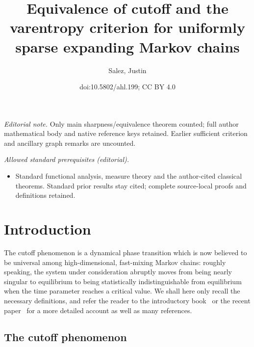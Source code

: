 \documentclass[10pt]{amsart}
\title{Equivalence of cutoff and the varentropy criterion for uniformly sparse expanding Markov chains}
\author{Salez, Justin}
\date{doi:10.5802/ahl.199; CC BY 4.0}
\theoremstyle{definition}\newtheorem{defi}[theo]{Definition}\newtheorem{rema}[theo]{Remark}\newtheorem{exam}[theo]{Example}\newtheorem{exem}[theo]{Example}\newtheorem{nota}[theo]{Notation}
\begin{document}
\maketitle
\noindent\textit{Editorial note.} Only main sharpness/equivalence theorem counted; full author mathematical body and native reference keys retained. Earlier sufficient criterion and ancillary graph remarks are uncounted.\par\medskip
\noindent\textit{Allowed standard prerequisites (editorial).}\begin{itemize}
\item Standard functional analysis, measure theory and the author-cited classical theorems. Standard prior results stay cited; complete source-local proofs and definitions retained.
\end{itemize}\medskip

\section{Introduction}

The cutoff phenomenon is a dynamical phase transition which is now believed to be universal among high-dimensional, fast-mixing Markov chains: roughly speaking, the system under consideration abruptly moves from being nearly singular to equilibrium to being statistically indistinguishable from equilibrium when the time parameter reaches a critical value. We shall here only recall the necessary definitions, and refer the reader to the introductory book~\cite[Chapter~18]{MR3726904} or the recent paper~\cite{arxiv.2102.05597} for a more detailed account as well as many references.

\subsection{The cutoff phenomenon}
\end{document}
